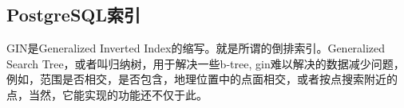 \documentclass[../../../interview-questions.tex]{subfiles}
\begin{document}
\subsection{PostgreSQL索引}

GIN是Generalized Inverted Index的缩写。就是所谓的倒排索引。Generalized Search Tree，或者叫归纳树，用于解决一些b-tree, gin难以解决的数据减少问题，例如，范围是否相交，是否包含，地理位置中的点面相交，或者按点搜索附近的点，当然，它能实现的功能还不仅于此。
\end{document}
